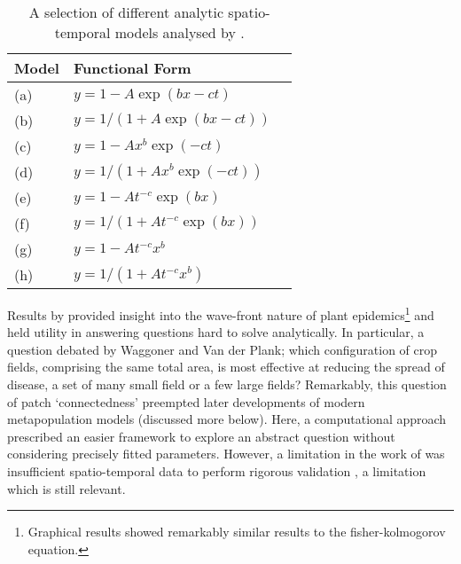 \vspace{1em}
\begin{table}[h]
\centering
\begin{tabular}{l l l}
\hline
\textbf{Model} & \textbf{Functional Form} \\
\hline
(a)  & $y = 1 - A\exp(bx - ct)$\\ 
(b) & $y = 1/(1 + A\exp(bx - ct))$\\
(c) & $y = 1 - Ax^{b}\exp(-ct)$ \\
(d) & $y = 1/(1 + Ax^{b}\exp(-ct))$\\
(e) & $y = 1 - At^{-c}\exp(bx)$\\
(f) & $y = 1/(1 + At^{-c}\exp(bx))$\\
(g) & $y = 1 - At^{-c}x^{b}$\\
(h) & $y = 1/(1 + At^{-c}x^{b})$\\
\hline
\end{tabular}
\caption{A selection of different analytic spatio-temporal models analysed by \cite{jeger1983analysing}.}
\label{table:1}
\end{table}

Results by \cite{zadoks1977role} provided insight into the wave-front nature of plant epidemics\footnote{Graphical results showed remarkably similar results to the fisher-kolmogorov equation.} and held utility in answering questions hard to solve analytically. In particular, a question debated by Waggoner and Van der Plank; which configuration of crop fields, comprising the same total area, is most effective at reducing the spread of disease, a set of many small field or a few large fields? Remarkably, this question of patch `connectedness' preempted later developments of modern metapopulation models (discussed more below). Here, a computational approach prescribed an easier framework to explore an abstract question without considering precisely fitted parameters. However, a limitation in the work of  \cite{zadoks1977role} was insufficient spatio-temporal data to perform rigorous validation \cite{teng1981validation}, a limitation which is still relevant.\\

